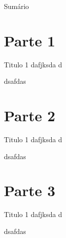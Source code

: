 \begin{slide}{Sumário}
\tableofcontents
\end{slide}

\section{Parte 1}

\begin{slide}{Titulo 1}
dafjksda
d

dsafdas
\end{slide}


\section{Parte 2}

\begin{slide}{Titulo 1}
dafjksda
d

dsafdas
\end{slide}

\section{Parte 3}

\begin{slide}{Titulo 1}
dafjksda
d

dsafdas
\end{slide}